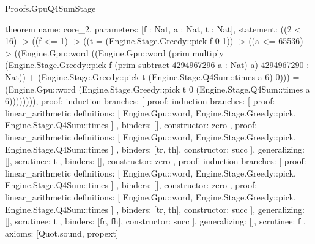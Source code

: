 \begin{lexlean}{Proofs.GpuQ4SumStage}
\begin{semanticmodule}
theorem{
  name: core_2,
  parameters: [f : Nat, a : Nat, t : Nat],
  statement: ((2 < 16) -> ((f <= 1) -> ((t = (Engine.Stage.Greedy::pick f 0 1)) -> ((a <= 65536) -> ((Engine.Gpu::word ((Engine.Gpu::word (prim multiply (Engine.Stage.Greedy::pick f (prim subtract 4294967296 a : Nat) a) 4294967290 : Nat)) + (Engine.Stage.Greedy::pick t (Engine.Stage.Q4Sum::times a 6) 0))) = (Engine.Gpu::word (Engine.Stage.Greedy::pick t 0 (Engine.Stage.Q4Sum::times a 6)))))))),
  proof: induction{
    branches: [
      {
        proof: induction{
          branches: [
            {
              proof: linear_arithmetic{
                definitions: [
                  Engine.Gpu::word,
                  Engine.Stage.Greedy::pick,
                  Engine.Stage.Q4Sum::times
                ]
              },
              binders: [],
              constructor: zero
            },
            {
              proof: linear_arithmetic{
                definitions: [
                  Engine.Gpu::word,
                  Engine.Stage.Greedy::pick,
                  Engine.Stage.Q4Sum::times
                ]
              },
              binders: [tr, th],
              constructor: succ
            }
          ],
          generalizing: [],
          scrutinee: t
        },
        binders: [],
        constructor: zero
      },
      {
        proof: induction{
          branches: [
            {
              proof: linear_arithmetic{
                definitions: [
                  Engine.Gpu::word,
                  Engine.Stage.Greedy::pick,
                  Engine.Stage.Q4Sum::times
                ]
              },
              binders: [],
              constructor: zero
            },
            {
              proof: linear_arithmetic{
                definitions: [
                  Engine.Gpu::word,
                  Engine.Stage.Greedy::pick,
                  Engine.Stage.Q4Sum::times
                ]
              },
              binders: [tr, th],
              constructor: succ
            }
          ],
          generalizing: [],
          scrutinee: t
        },
        binders: [fr, fh],
        constructor: succ
      }
    ],
    generalizing: [],
    scrutinee: f
  },
  axioms: [Quot.sound, propext]
}


\end{semanticmodule}
\end{lexlean}
